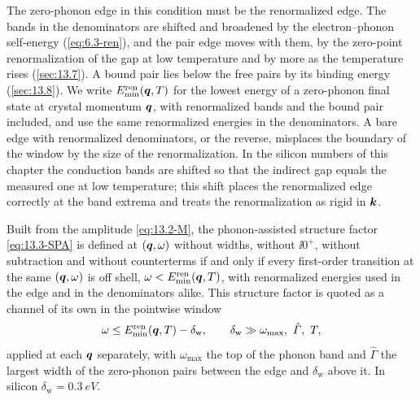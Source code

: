 The zero-phonon edge in this condition must be the renormalized edge. The bands in the denominators are shifted and broadened by the electron--phonon self-energy (\cref{eq:6.3-ren}), and the pair edge moves with them, by the zero-point renormalization of the gap at low temperature and by more as the temperature rises (\cref{sec:13.7}). A bound pair lies below the free pairs by its binding energy (\cref{sec:13.8}). We write $E^{\mathrm{ren}}_{\mathrm{min}}(\bm{q},T)$ for the lowest energy of a zero-phonon final state at crystal momentum $\bm{q}$, with renormalized bands and the bound pair included, and use the same renormalized energies in the denominators. A bare edge with renormalized denominators, or the reverse, misplaces the boundary of the window by the size of the renormalization. In the silicon numbers of this chapter the conduction bands are shifted so that the indirect gap equals the measured one at low temperature; this shift places the renormalized edge correctly at the band extrema and treats the renormalization as rigid in $\bm{k}$.
\begin{keyresult}
Built from the amplitude \cref{eq:13.2-M}, the phonon-assisted structure factor \cref{eq:13.3-SPA} is defined at $(\bm{q},\omega)$ without widths, without $\ii0^+$, without subtraction and without counterterms if and only if every first-order transition at the same $(\bm{q},\omega)$ is off shell, $\omega < E^{\mathrm{ren}}_{\mathrm{min}}(\bm{q},T)$, with renormalized energies used in the edge and in the denominators alike. This structure factor is quoted as a channel of its own in the pointwise window
\begin{equation}
  \omega \le E^{\mathrm{ren}}_{\mathrm{min}}(\bm{q},T) - \delta_{\mathrm{w}} , \qquad
  \delta_{\mathrm{w}} \gg \omega_{\max},\ \hat\varGamma,\ T ,
  \label{eq:13.6-window}
\end{equation}
applied at each $\bm{q}$ separately, with $\omega_{\max}$ the top of the phonon band and $\hat\varGamma$ the largest width of the zero-phonon pairs between the edge and $\delta_{\mathrm{w}}$ above it. In silicon $\delta_{\mathrm{w}} = \SI{0.3}{eV}$.
\end{keyresult}
